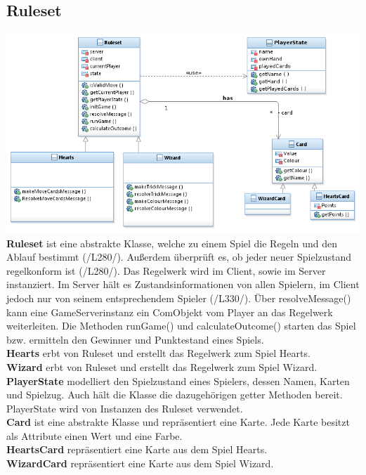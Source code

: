 \documentclass{article}
\begin{document}
\subsection{Ruleset}
\includegraphics[width=\textwidth]{Ruleset}
\textbf{Ruleset} ist eine abstrakte Klasse, welche zu einem Spiel die Regeln und den Ablauf bestimmt (/L280/). Außerdem überprüft es, ob jeder neuer Spielzustand regelkonform ist (/L280/). Das Regelwerk wird im Client, sowie im Server instanziert. Im Server hält es Zustandsinformationen von allen Spielern, im Client jedoch nur von seinem entsprechendem Spieler (/L330/). Über resolveMessage() kann eine GameServerinstanz ein ComObjekt vom Player an das Regelwerk weiterleiten. Die Methoden runGame() und calculateOutcome() starten das Spiel bzw. ermitteln den Gewinner und Punktestand eines Spiels. \\
		\textbf{Hearts} erbt von Ruleset und erstellt das Regelwerk zum Spiel Hearts. \\
		\textbf{Wizard} erbt von Ruleset und erstellt das Regelwerk zum Spiel Wizard. \\
		\textbf{PlayerState} modelliert den Spielzustand eines Spielers, dessen Namen, Karten und Spielzug. Auch hält die Klasse die dazugehörigen getter Methoden bereit. PlayerState wird von Instanzen des Ruleset verwendet. \\
		\textbf{Card} ist eine abstrakte Klasse und repräsentiert eine Karte. Jede Karte besitzt als Attribute einen Wert und eine Farbe. \\
		\textbf{HeartsCard} repräsentiert eine Karte aus dem Spiel Hearts. \\
		\textbf{WizardCard} repräsentiert eine Karte aus dem Spiel Wizard.
\end{document}
